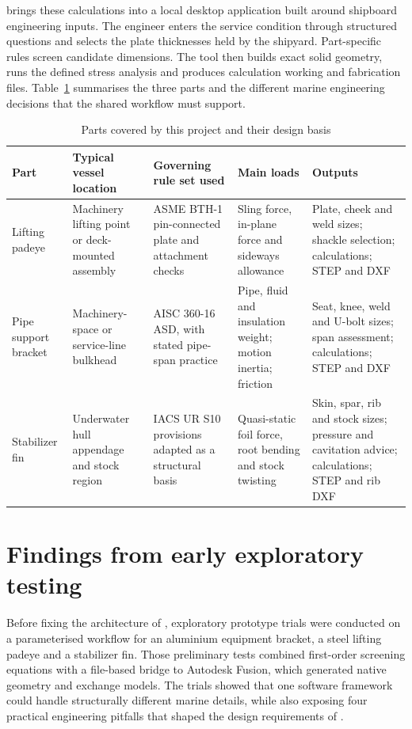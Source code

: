 \NEMO{} brings these calculations into a local desktop application built around shipboard engineering inputs. The engineer enters the service condition through structured questions and selects the plate thicknesses held by the shipyard. Part-specific rules screen candidate dimensions. The tool then builds exact solid geometry, runs the defined stress analysis and produces calculation working and fabrication files. Table~\ref{tab:intro-parts} summarises the three parts and the different marine engineering decisions that the shared workflow must support.

\begin{table}[H]
\centering
\caption{Parts covered by this project and their design basis}
\label{tab:intro-parts}
\small
\begin{tabularx}{\textwidth}{p{}p{}p{}XX}
\toprule
Part & Typical vessel location & Governing rule set used & Main loads & Outputs \\
\midrule
Lifting padeye & Machinery lifting point or deck-mounted assembly & ASME BTH-1 pin-connected plate and attachment checks & Sling force, in-plane force and sideways allowance & Plate, cheek and weld sizes; shackle selection; calculations; STEP and DXF \\
Pipe support bracket & Machinery-space or service-line bulkhead & AISC 360-16 ASD, with stated pipe-span practice & Pipe, fluid and insulation weight; motion inertia; friction & Seat, knee, weld and U-bolt sizes; span assessment; calculations; STEP and DXF \\
Stabilizer fin & Underwater hull appendage and stock region & IACS UR S10 provisions adapted as a structural basis & Quasi-static foil force, root bending and stock twisting & Skin, spar, rib and stock sizes; pressure and cavitation advice; calculations; STEP and rib DXF \\
\bottomrule
\end{tabularx}
\end{table}

\section{Findings from early exploratory testing}
\label{sec:early-testing}

Before fixing the architecture of \NEMO{}, exploratory prototype trials were conducted on a parameterised workflow for an aluminium equipment bracket, a steel lifting padeye and a stabilizer fin. Those preliminary tests combined first-order screening equations with a file-based bridge to Autodesk Fusion, which generated native geometry and exchange models. The trials showed that one software framework could handle structurally different marine details, while also exposing four practical engineering pitfalls that shaped the design requirements of \NEMO{}.

